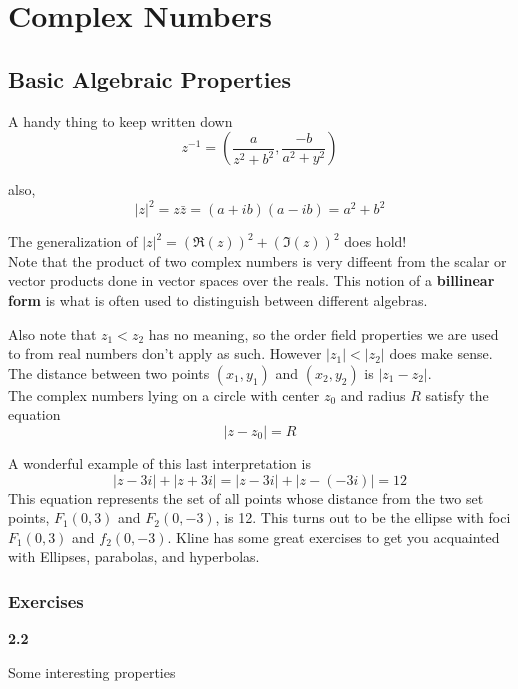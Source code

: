 \section{Complex Numbers}

\subsection{Basic Algebraic Properties}

A handy thing to keep written down
$$
z^{-1} = \left(\frac{a}{z^2 + b^2}, \frac{-b}{a^2 + y^2}\right)
$$

also,
$$
|z|^2 = z\bar{z} = (a + ib)(a - ib) = a^2 + b^2
$$

The generalization of $|z|^2 = (\Re(z))^2 + (\Im(z))^2$ does hold!
\\


Note that the product of two complex numbers is very diffeent from the scalar or vector products
done in vector spaces over the reals.
This notion of a \textbf{billinear form} is what is often used to distinguish between different
algebras.

Also note that $z_1 < z_2$ has no meaning, so the order field properties we are used to from
real numbers don't apply as such.
However $|z_1| < |z_2|$ does make sense.
\\

The distance between two points $(x_1, y_1)$ and $(x_2, y_2)$ is $|z_1 - z_2|$.
\\

The complex numbers lying on a circle with center $z_0$ and radius $R$ satisfy the equation
$$
|z - z_0| = R
$$

A wonderful example of this last interpretation is
$$
|z - 3i| + |z + 3i| = |z - 3i| + |z - (-3i)| = 12
$$
This equation represents the set of all points whose distance from the two set points, $F_1(0,3)$
and $F_2(0,-3)$, is 12.
This turns out to be the ellipse with foci $F_1(0,3)$ and $f_2(0,-3)$.
Kline has some great exercises to get you acquainted with Ellipses, parabolas, and hyperbolas.


\subsubsection{Exercises}

\textbf{2.2}

Some interesting properties

